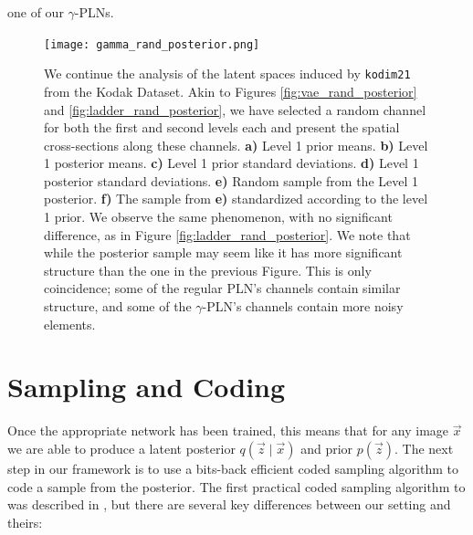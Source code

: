one of our $\gamma$-PLNs.
\begin{figure}
  \centering
  \texttt{[image: gamma\_rand\_posterior.png]}
  \caption[Latent spaces induced by \texttt{kodim21} in our $\gamma$-PLN.]
  {We continue the analysis of the latent spaces induced by
    \texttt{kodim21} from the Kodak Dataset. Akin to Figures
    \ref{fig:vae_rand_posterior} and \ref{fig:ladder_rand_posterior},
    we have selected a random channel for both the
    first and second levels each and present the spatial cross-sections along these
    channels. \textbf{a)} Level 1 prior means. \textbf{b)} Level 1 posterior means.
    \textbf{c)} Level 1 prior standard deviations. \textbf{d)} Level 1 posterior
    standard deviations. \textbf{e)} Random sample from the Level 1 posterior.
    \textbf{f)} The sample from \textbf{e)} standardized according to the level
    1 prior. We observe the same phenomenon, with no significant difference, as
    in Figure \ref{fig:ladder_rand_posterior}. We note that while the posterior
    sample may seem like it has more significant structure than the one in the
    previous Figure. This is only coincidence; some of the regular PLN's
    channels contain similar structure, and some of the $\gamma$-PLN's channels
    contain more noisy elements.
  }
  \label{fig:gamma_rand_posterior}
\end{figure}

\section{Sampling and Coding}
\label{sec:coded_sampling}
\par
Once the appropriate network has been trained, this means that for any image $\vec{x}$
we are able to produce a latent posterior $q(\vec{z} \mid \vec{x})$ and prior
$p(\vec{z})$. The next step in our framework is to use a bits-back efficient coded sampling
algorithm to code a sample from the posterior. The first practical coded
sampling algorithm to was described in \cite{havasi2018minimal}, but there
are several key differences between our setting and theirs:

